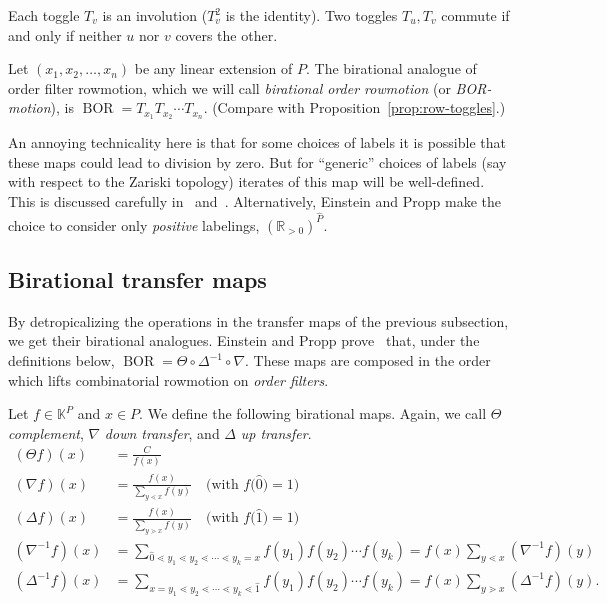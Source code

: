 \documentclass[ALCO,ThmDefs,Unicode,epreuves]{cedram}
\newcommand{\defn}[1]{\emph{#1}}
\newcommand{\rr}{\mathbb{R}}
\newcommand{\kk}{\mathbb{K}}
\newcommand{\down}{\nabla}
\newcommand{\up}{\Delta}
\DeclareMathOperator{\BOR}{BOR}
\begin{document}
\begin{prop}\label{prop:BTogO-toggle-inv-commute}
Each toggle $T_v$ is an involution (\ie $T_v^2$ is the identity). Two toggles $T_u,T_v$ commute if and only if neither $u$ nor $v$ covers the other.
\end{prop}

\begin{defi}
Let $(x_1,x_2,\dots,x_n)$ be any linear extension of $P$.
The birational analogue of order filter rowmotion, which we will call
\defn{birational order rowmotion} (or \defn{BOR-motion}),
is $\BOR= T_{x_1} T_{x_2} \cdots T_{x_n}$. (Compare with
Proposition~\ref{prop:row-toggles}.)
\end{defi}
An annoying technicality here is that for some choices of labels it is possible that these
maps could lead to division by zero. But for ``generic'' choices of labels (say with respect to the
Zariski topology) iterates of this map will be well-defined. This is discussed
carefully in~\cite[\S~1]{GrRo16} and~\cite[\S~3]{GrRo15}. Alternatively, Einstein and Propp
make the choice to consider only \textit{positive} labelings, \ie $(\rr_{>
0})^{\widehat{P}}$.


\subsection{Birational transfer maps}
By detropicalizing the operations in the transfer maps of the previous subsection, we get
their birational analogues. Einstein and Propp prove~\cite[\S~6]{einpropp} that, under the definitions below,
$\BOR=\Theta\circ\up^{-1}\circ\down$. 
These maps are composed in the order which lifts 
combinatorial rowmotion on \textit{order filters}.


\begingroup 
\allowdisplaybreaks

\begin{defi}\label{def:bir-trans}
Let $f\in \kk^P$ and $x\in P$. We define the following birational maps. 
Again, we call $\Theta$ \defn{complement}, $\down$ \defn{down transfer},
and $\up$ \defn{up transfer}.
\begin{align*}
 (\Theta f)(x) &= \frac{C}{f(x)}\\
 (\down f)(x) &= \frac{f(x)}{\sum\limits_{y\lessdot x} f(y)} \quad \big(\text{with } f\big(\widehat{0}\big)=1\big)\\
 (\up f)(x) &= 
 \frac{f(x)}{\sum\limits_{y\gtrdot x} f(y)} \quad \big(\text{with } f\big(\widehat{1}\big)=1\big)\\
 \left(\down^{-1}f\right)(x) &=
 \sum_{\widehat{0}\lessdot y_1\lessdot y_2 \lessdot \cdots \lessdot y_k=x} f(y_1)f(y_2)\cdots f(y_k)
 =f(x) \sum\limits_{y\lessdot x}\left(\down^{-1}f\right)(y)\\
 \left(\up^{-1}f\right)(x) &=
 \sum_{x=y_1 \lessdot y_2\lessdot \cdots \lessdot y_k\lessdot \widehat{1}} f(y_1)f(y_2)\cdots f(y_k)
 =f(x) \sum\limits_{y\gtrdot x}\left(\up^{-1}f\right)(y).
\end{align*}
\end{defi}
\end{document}
